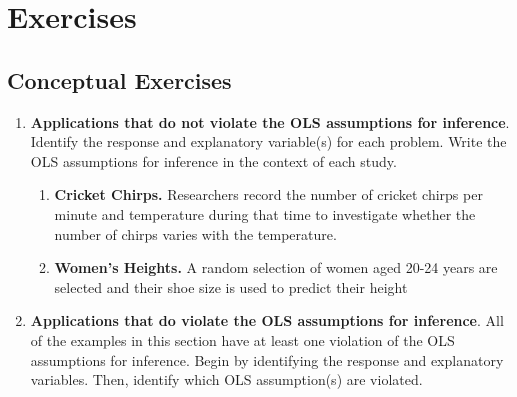 \documentclass[
]{krantz}
\providecommand{\tightlist}{%
  \setlength{\itemsep}{0pt}\setlength{\parskip}{0pt}}
\begin{document}
\hypertarget{exercises}{%
\section{Exercises}\label{exercises}}

\hypertarget{conceptual-exercises}{%
\subsection{Conceptual Exercises}\label{conceptual-exercises}}

\begin{enumerate}
\def\labelenumi{\arabic{enumi}.}
\item
  \textbf{Applications that do not violate the OLS assumptions for inference}. Identify the response and explanatory variable(s) for each problem. Write the OLS assumptions for inference in the context of each study.

  \begin{enumerate}
  \def\labelenumii{\alph{enumii}.}
  \tightlist
  \item
    \textbf{Cricket Chirps.} Researchers record the number of cricket chirps per minute and temperature during that time to investigate whether the number of chirps varies with the temperature.
  \item
    \textbf{Women's Heights.} A random selection of women aged 20-24 years are selected and their shoe size is used to predict their height\\
  \end{enumerate}
\item
  \textbf{Applications that do violate the OLS assumptions for inference}. All of the examples in this section have at least one violation of the OLS assumptions for inference. Begin by identifying the response and explanatory variables. Then, identify which OLS assumption(s) are violated.


\end{enumerate}
\end{document}
